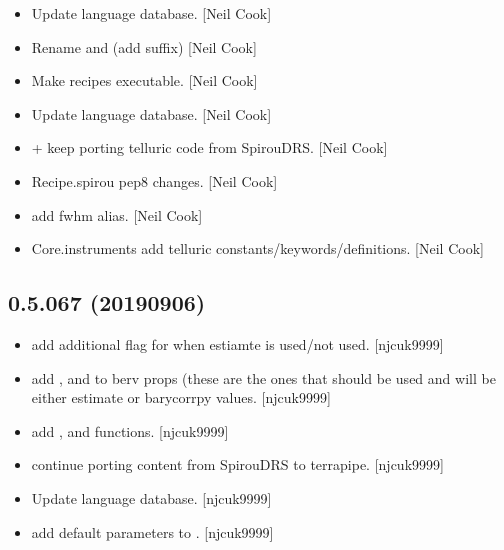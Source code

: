 \documentclass[a4paper,10pt,english]{report}
\begin{document}
\begin{itemize}
\item {} 
Update language database. {[}Neil Cook{]}

\item {} 
Rename  and  (add  suffix) {[}Neil Cook{]}

\item {} 
Make recipes executable. {[}Neil Cook{]}

\item {} 
Update language database. {[}Neil Cook{]}

\item {} 
 +  \sphinxhyphen{} keep porting telluric code from
SpirouDRS. {[}Neil Cook{]}

\item {} 
Recipe.spirou \sphinxhyphen{} pep8 changes. {[}Neil Cook{]}

\item {} 
 \sphinxhyphen{} add fwhm alias. {[}Neil Cook{]}

\item {} 
Core.instruments \sphinxhyphen{} add telluric constants/keywords/definitions. {[}Neil
Cook{]}

\end{itemize}


\subsection{0.5.067 (2019\sphinxhyphen{}09\sphinxhyphen{}06)}
\label{\detokenize{misc/changelog:id95}}\begin{itemize}
\item {} 
 \sphinxhyphen{} add additional flag for when estiamte is
used/not used. {[}njcuk9999{]}

\item {} 
 \sphinxhyphen{} add ,  and  to berv props
(these are the ones that should be used and will be either estimate or
barycorrpy values. {[}njcuk9999{]}

\item {} 
 \sphinxhyphen{} add ,
 and  functions. {[}njcuk9999{]}

\item {} 
 \sphinxhyphen{} continue porting content from SpirouDRS to
terrapipe. {[}njcuk9999{]}

\item {} 
Update language database. {[}njcuk9999{]}

\item {} 
 \sphinxhyphen{} add default parameters to .
{[}njcuk9999{]}

\end{itemize}
\end{document}
